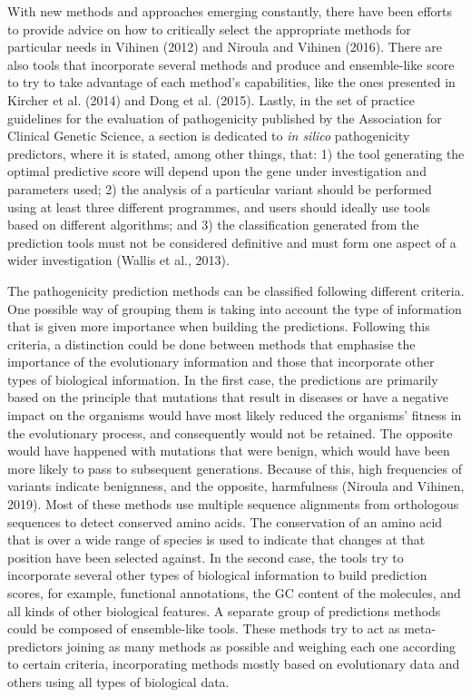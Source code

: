 \documentclass[12pt,MSc,wordcount,anon]{muthesis}
\begin{document}
\begin{flushleft}
With new methods and approaches emerging constantly, there have been efforts to provide advice on how to critically select the appropriate methods for particular needs in Vihinen (2012) and Niroula and Vihinen (2016). There are also tools that incorporate several methods and produce and ensemble-like score to try to take advantage of each method's capabilities, like the ones presented in Kircher et al. (2014) and Dong et al. (2015). Lastly, in the set of practice guidelines for the evaluation of pathogenicity published by the Association for Clinical Genetic Science, a section is dedicated to \textit{in silico} pathogenicity predictors, where it is stated, among other things, that: 1) the tool generating the optimal predictive score will depend upon the gene under investigation and parameters used; 2) the analysis of a particular variant should be performed using at least three different programmes, and users should ideally use tools based on different algorithms; and 3) the classification generated from the prediction tools must not be considered definitive and must form one aspect of a wider investigation (Wallis et al., 2013).

The pathogenicity prediction methods can be classified following different criteria. One possible way of grouping them is taking into account the type of information that is given more importance when building the predictions. Following this criteria, a distinction could be done between methods that emphasise the importance of the evolutionary information and those that incorporate other types of biological information. In the first case, the predictions are primarily based on the principle that mutations that result in diseases or have a negative impact on the organisms would have most likely reduced the organisms' fitness in the evolutionary process, and consequently would not be retained. The opposite would have happened with mutations that were benign, which would have been more likely to pass to subsequent generations. Because of this, high frequencies of variants indicate benignness, and the opposite, harmfulness (Niroula and Vihinen, 2019). Most of these methods use multiple sequence alignments from orthologous sequences to detect conserved amino acids. The conservation of an amino acid that is over a wide range of species is used to indicate that changes at that position have been selected against. In the second case, the tools try to incorporate several other types of biological information to build prediction scores, for example, functional annotations, the GC content of the molecules, and all kinds of other biological features. A separate group of predictions methods could be composed of ensemble-like tools. These methods try to act as meta-predictors joining as many methods as possible and weighing each one according to certain criteria, incorporating methods mostly based on evolutionary data and others using all types of biological data.


\end{flushleft}
\end{document}
